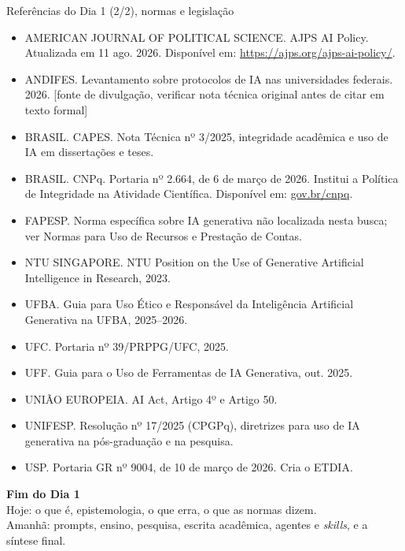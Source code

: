 \documentclass[11pt,aspectratio=169,t]{beamer}
\begin{document}
\begin{frame}{Referências do Dia 1 (2/2), normas e legislação}
  \tiny
  \begin{itemize}
    \item AMERICAN JOURNAL OF POLITICAL SCIENCE. AJPS AI Policy. Atualizada em 11 ago. 2026. Disponível em: \url{https://ajps.org/ajps-ai-policy/}.
    \item ANDIFES. Levantamento sobre protocolos de IA nas universidades federais. 2026. \alert{[fonte de divulgação, verificar nota técnica original antes de citar em texto formal]}
    \item BRASIL. CAPES. Nota Técnica nº 3/2025, integridade acadêmica e uso de IA em dissertações e teses.
    \item BRASIL. CNPq. Portaria nº 2.664, de 6 de março de 2026. Institui a Política de Integridade na Atividade Científica. Disponível em: \url{gov.br/cnpq}.
    \item FAPESP. Norma específica sobre IA generativa não localizada nesta busca; ver Normas para Uso de Recursos e Prestação de Contas.
    \item NTU SINGAPORE. NTU Position on the Use of Generative Artificial Intelligence in Research, 2023.
    \item UFBA. Guia para Uso Ético e Responsável da Inteligência Artificial Generativa na UFBA, 2025--2026.
    \item UFC. Portaria nº 39/PRPPG/UFC, 2025.
    \item UFF. Guia para o Uso de Ferramentas de IA Generativa, out. 2025.
    \item UNIÃO EUROPEIA. AI Act, Artigo 4º e Artigo 50.
    \item UNIFESP. Resolução nº 17/2025 (CPGPq), diretrizes para uso de IA generativa na pós-graduação e na pesquisa.
    \item USP. Portaria GR nº 9004, de 10 de março de 2026. Cria o ETDIA.
  \end{itemize}
\end{frame}

\begin{frame}[plain]
  \centering
  \vspace*{2cm}
  {\Huge\color{azulUNI}\textbf{Fim do Dia 1}}\\[1cm]
  {\large Hoje: o que é, epistemologia, o que erra, o que as normas dizem.}\\[0.6cm]
  {\normalsize\color{laranjaDestaque} Amanhã: prompts, ensino, pesquisa, escrita acadêmica, agentes e \textit{skills}, e a síntese final.}
\end{frame}
\end{document}
